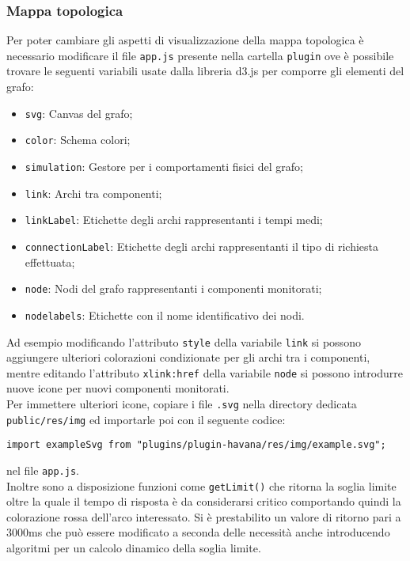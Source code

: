 \subsubsection{Mappa topologica}
\label{sec:graph}
Per poter cambiare gli aspetti di visualizzazione della mappa topologica è necessario modificare il file \texttt{app.js} presente nella cartella \texttt{plugin} ove è possibile trovare le seguenti variabili usate dalla libreria d3.js per comporre gli elementi del grafo:
\begin{itemize}
	\item \texttt{svg}: Canvas del grafo;
	\item \texttt{color}: Schema colori;
	\item \texttt{simulation}: Gestore per i comportamenti fisici del grafo;
	\item \texttt{link}: Archi tra componenti;
	\item \texttt{linkLabel}: Etichette degli archi rappresentanti i tempi medi;
	\item \texttt{connectionLabel}: Etichette degli archi rappresentanti il tipo di richiesta effettuata;
	\item \texttt{node}: Nodi del grafo rappresentanti i componenti monitorati;
	\item \texttt{nodelabels}: Etichette con il nome identificativo dei nodi.
\end{itemize}
Ad esempio modificando l'attributo \texttt{style} della variabile \texttt{link} si possono aggiungere ulteriori colorazioni condizionate per gli archi tra i componenti, mentre editando l'attributo \texttt{xlink:href} della variabile \texttt{node} si possono introdurre nuove icone per nuovi componenti monitorati. \\
Per immettere ulteriori icone, copiare i file \texttt{.svg} nella directory dedicata \texttt{public/res/img} ed importarle poi con il seguente codice:
\begin{lstlisting}
import exampleSvg from "plugins/plugin-havana/res/img/example.svg";
\end{lstlisting}
nel file \texttt{app.js}.\\
Inoltre sono a disposizione funzioni come \texttt{getLimit()} che ritorna la soglia limite oltre la quale il tempo di risposta è da considerarsi critico comportando quindi la colorazione rossa dell'arco interessato. 
Si è prestabilito un valore di ritorno pari a 3000ms che può essere modificato a seconda delle necessità anche introducendo algoritmi per un calcolo dinamico della soglia limite. \\

